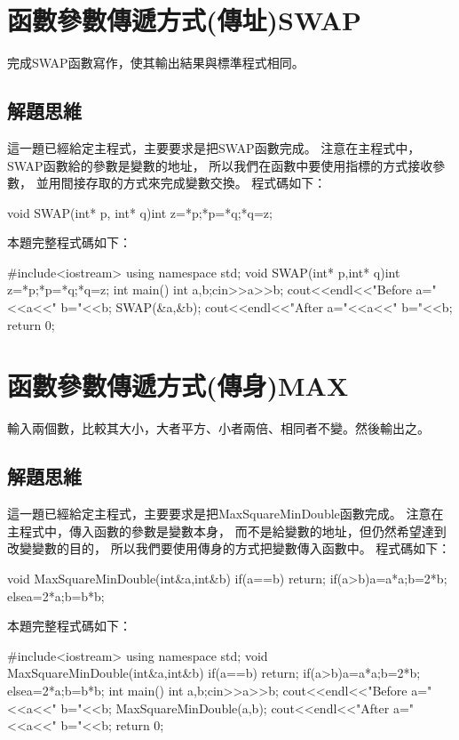 	
\section{函數參數傳遞方式(傳址)SWAP}
完成SWAP函數寫作，使其輸出結果與標準程式相同。

\subsection{解題思維}
這一題已經給定主程式，主要要求是把SWAP函數完成。
注意在主程式中，SWAP函數給的參數是變數的地址，
所以我們在函數中要使用指標的方式接收參數，
並用間接存取的方式來完成變數交換。
程式碼如下：
\begin{inside}
	void SWAP(int* p, int* q){int z=*p;*p=*q;*q=z;}
\end{inside}

本題完整程式碼如下：	
\begin{cppcode}
#include<iostream>
using namespace std;
void SWAP(int* p,int* q){int z=*p;*p=*q;*q=z;}
int main(){
	int a,b;cin>>a>>b;
	cout<<endl<<"Before a="<<a<<" b="<<b;
	SWAP(&a,&b);
	cout<<endl<<"After a="<<a<<" b="<<b;
	return 0;
}
\end{cppcode}


\section{函數參數傳遞方式(傳身)MAX}
輸入兩個數，比較其大小，大者平方、小者兩倍、相同者不變。然後輸出之。

\subsection{解題思維}
這一題已經給定主程式，主要要求是把MaxSquareMinDouble函數完成。
注意在主程式中，傳入函數的參數是變數本身，
而不是給變數的地址，但仍然希望達到改變變數的目的，
所以我們要使用傳身的方式把變數傳入函數中。
程式碼如下：
\begin{inside}
void MaxSquareMinDouble(int&a,int&b){
	if(a==b) return;
	if(a>b){a=a*a;b=2*b;}
	else{a=2*a;b=b*b;}
}
\end{inside}

本題完整程式碼如下：	
\begin{cppcode}
#include<iostream>
using namespace std;
void MaxSquareMinDouble(int&a,int&b){
	if(a==b) return;
	if(a>b){a=a*a;b=2*b;}
	else{a=2*a;b=b*b;}
}
int main(){
	int a,b;cin>>a>>b;
	cout<<endl<<"Before a="<<a<<" b="<<b;
	MaxSquareMinDouble(a,b);
	cout<<endl<<"After a="<<a<<" b="<<b;
	return 0;
}
\end{cppcode}

